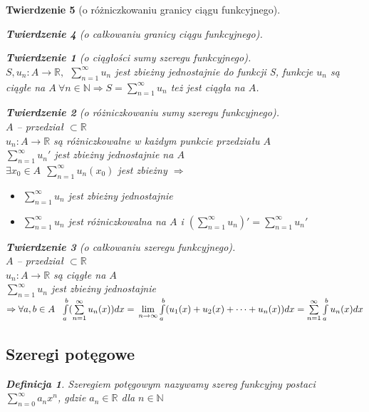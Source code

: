\documentclass[12pt,a4paper]{article}
\newtheorem{tw}{Twierdzenie}
\theoremstyle{definition}
\newtheorem{df}{Definicja}
\begin{document}
\begin{tw}[o różniczkowaniu granicy ciągu funkcyjnego]
\begin{tw}[o całkowaniu granicy ciągu funkcyjnego]
\begin{tw}[o ciągłości sumy szeregu funkcyjnego]~\\
$S, u_n: A \to \mathbb{R}, ~~ \sum\limits_{n=1}^\infty u_n$ jest zbieżny jednostajnie do funkcji S, funkcje $u_n$ są ciągłe na $A~ \forall n\in\mathbb{N} \Rightarrow S=\sum\limits_{n=1}^\infty u_n$ też jest ciągła na $A$.
\end{tw}

\begin{tw}[o różniczkowaniu sumy szeregu funkcyjnego]~\\
$A$ -- przedział $\subset \mathbb{R}$\\
$u_n: A \to \mathbb{R}$ są różniczkowalne w każdym punkcie przedziału $A$\\
$\sum\limits_{n=1}^\infty u_n'$ jest zbieżny jednostajnie na $A$\\
$\exists x_0\in A ~~ \sum\limits_{n=1}^\infty u_n(x_0)$ jest zbieżny $\Rightarrow$
\begin{itemize}
	\item $\sum\limits_{n=1}^\infty u_n$ jest zbieżny jednostajnie
	\item $\sum\limits_{n=1}^\infty u_n$ jest różniczkowalna na $A$ i $(\sum\limits_{n=1}^\infty u_n)' = \sum\limits_{n=1}^\infty u_n'$
\end{itemize}
\end{tw}

\begin{tw}[o całkowaniu szeregu funkcyjnego]~\\
$A$ -- przedział $\subset \mathbb{R}$\\
$u_n: A \to \mathbb{R}$ są ciągłe na $A$\\
$\sum\limits_{n=1}^\infty u_n$ jest zbieżny jednostajnie
$ \Rightarrow \forall a,b\in A ~~ \int\limits_a^b (\sum\limits_{n=1}^\infty u_n(x))dx =\\ \lim\limits_{n\to\infty}\int\limits_a^b (u_1(x) + u_2(x) + \dots + u_n(x))dx =  \sum\limits_{n=1}^\infty \int\limits_a^b u_n(x)dx$
\end{tw}

\subsection{Szeregi potęgowe}
\begin{df}
Szeregiem potęgowym nazywamy szereg funkcyjny postaci $\sum\limits_{n=0}^\infty a_nx^n$, gdzie $a_n\in\mathbb{R}$ dla $n\in\mathbb{N}$ 
\end{df}


\end{tw}
\end{tw}
\end{document}
